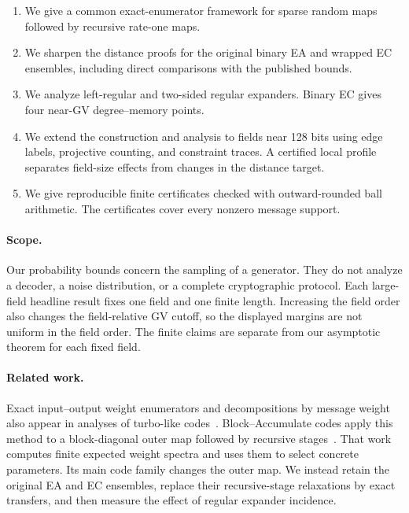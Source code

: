 \begin{enumerate}
  \item We give a common exact-enumerator framework for sparse random maps
  followed by recursive rate-one maps.
  \item We sharpen the distance proofs for the original binary EA and wrapped
  EC ensembles, including direct comparisons with the published bounds.
  \item We analyze left-regular and two-sided regular expanders.  Binary EC
  gives four near-GV degree--memory points.
  \item We extend the construction and analysis to fields near 128 bits using
  edge labels, projective counting, and constraint traces.  A certified local
  profile separates field-size effects from changes in the distance target.
  \item We give reproducible finite certificates checked with outward-rounded
  ball arithmetic.  The certificates cover every nonzero message support.
\end{enumerate}

\paragraph{Scope.}
Our probability bounds concern the sampling of a generator.  They do not
analyze a decoder, a noise distribution, or a complete cryptographic
protocol.  Each large-field headline result fixes one field and one finite
length.  Increasing the field order also changes the field-relative GV
cutoff, so the displayed margins are not uniform in the field order.  The
finite claims are separate from our asymptotic theorem for each fixed field.

\paragraph{Related work.}
Exact input--output weight enumerators and decompositions by message weight
also appear in analyses of turbo-like codes~\cite{BazziMahdianSpielman2003}.
Block--Accumulate codes apply this method to a block-diagonal outer map
followed by recursive stages~\cite{BlockAccumulate2026}.  That work computes
finite expected weight spectra and uses them to select concrete parameters.
Its main code family changes the outer map.  We instead retain the original
EA and EC ensembles, replace their recursive-stage relaxations by exact
transfers, and then measure the effect of regular expander incidence.

